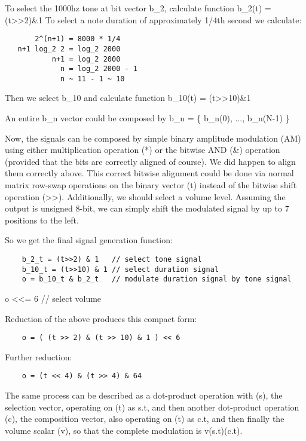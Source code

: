 \documentclass[11pt]{book}
\begin{document}
To select the 1000hz tone at bit vector b\_2, calculate function b\_2(t) = (t>>2)\&1
To select a note duration of approximately 1/4th second we calculate:

\begin{verbatim}
       2^(n+1) = 8000 * 1/4
   n+1 log_2 2 = log_2 2000
           n+1 = log_2 2000
             n = log_2 2000 - 1
             n ~ 11 - 1 ~ 10
\end{verbatim}

Then we select b\_10 and calculate function b\_10(t) = (t>>10)\&1

An entire b\_n vector could be composed by b\_n = \{ b\_n(0), ..., b\_n(N-1) \}

Now, the signals can be composed by simple binary amplitude modulation (AM) using either multiplication operation (*) or the bitwise AND (\&)
operation (provided that the bits are correctly aligned of course). We did happen to align them correctly above. This correct bitwise alignment
could be done via normal matrix row-swap operations on the binary vector (t) instead of the bitwise shift operation (>>). Additionally, we
should select a volume level. Assuming the output is unsigned 8-bit, we can simply shift the modulated signal by up to 7 positions to the left.

So we get the final signal generation function:

\begin{verbatim}
	b_2_t = (t>>2) & 1   // select tone signal
	b_10_t = (t>>10) & 1 // select duration signal
	o = b_10_t & b_2_t   // modulate duration signal by tone signal
\end{verbatim}
	o <<= 6              // select volume

Reduction of the above produces this compact form:

\begin{verbatim}
	o = ( (t >> 2) & (t >> 10) & 1 ) << 6
\end{verbatim}

Further reduction:

\begin{verbatim}
	o = (t << 4) & (t >> 4) & 64
\end{verbatim}

The same process can be described as a dot-product operation with (s), the selection vector, operating on (t) as s.t,
and then another dot-product operation (c), the composition vector, also operating on (t) as c.t, and then finally the
volume scalar (v), so that the complete modulation is v(s.t)(c.t).
\end{document}
